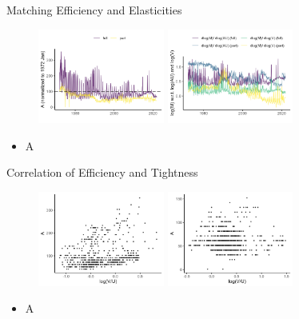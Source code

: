 \documentclass[aspectratio=169]{beamer}
\begin{document}
\begin{frame}{Matching Efficiency and Elasticities}
    \begin{figure}[!ht]
  \begin{center}
  \includegraphics[width = 0.37\textwidth]
  {figuretable/matching_efficiency_month_full_time_part_time.png}
  \includegraphics[width = 0.37\textwidth]
  {figuretable/elasticity_month_full_time_part_time.png}
  \end{center}
  \footnotesize
\end{figure} 

\begin{itemize}
    \item A
\end{itemize}
\end{frame}

\begin{frame}{Correlation of Efficiency and Tightness}
    
\begin{figure}[!ht]
  \begin{center}
  \includegraphics[width = 0.37\textwidth]
  {figuretable/efficiency_tightness_plot_month_full_time.png}
  \includegraphics[width = 0.37\textwidth]
  {figuretable/efficiency_tightness_plot_month_part_time.png}
  \end{center}
  \footnotesize
\end{figure} 
\begin{itemize}
    \item A
\end{itemize}
\end{frame}
\end{document}
